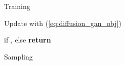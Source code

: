 \documentclass{article} \usepackage{iclr2023_conference,times}
\def\Eqref#1{(\ref{#1})}
\theoremstyle{plain}
\theoremstyle{definition}
\theoremstyle{remark}
\begin{document}
{\begin{figure}[ht]
\begin{minipage}[t]{0.495\textwidth}
\begin{algorithm}[H]
  \caption{Training} \label{alg:training}
  \small
  \begin{algorithmic}[1]
    \REPEAT
      \STATE 
      \STATE 
      \STATE 
      \STATE Update with \Eqref{eq:diffusion_gan_obj}
  \end{algorithmic}
\end{algorithm}
\end{minipage}
\hfill
\begin{minipage}[t]{0.495\textwidth}
\begin{algorithm}[H]
  \caption{Sampling} \label{alg:sampling}
  \small
  \begin{algorithmic}[1]
    \vspace{.04in}
    \STATE 
      \STATE  
    \ELSE
      \STATE  
      \ENDIF
    \FOR{}
      \STATE  if , else 
      \STATE 
    \ENDFOR
    \STATE \textbf{return} 
    \vspace{.04in}
  \end{algorithmic}
\end{algorithm}
\end{minipage}
\vspace{-1em}
\end{figure}











}
\end{document}
